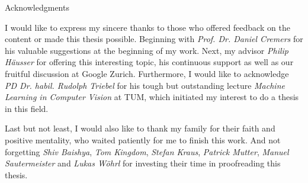 \thispagestyle{empty}

\vspace*{20mm}

\begin{center}
{ Acknowledgments}
\end{center}

\vspace{10mm}

I would like to express my sincere thanks to those who offered feedback on the content or made this thesis possible. Beginning with \textit{Prof. Dr. Daniel Cremers} for his valuable suggestions at the beginning of my work. Next, my advisor \textit{Philip Häusser} for offering this interesting topic, his continuous support as well as our fruitful discussion at Google Zurich. Furthermore, I would like to acknowledge \textit{PD Dr. habil. Rudolph Triebel} for his tough but outstanding lecture \textit{Machine Learning in Computer Vision} at TUM, which initiated my interest to do a thesis in this field.


Last but not least, I would also like to thank my family for their faith and positive mentality, who waited patiently for me to finish this work. And not forgetting \textit{Shiv Baishya}, \textit{Tom Kingdom}, \textit{Stefan Kraus}, \textit{Patrick Mutter}, \textit{Manuel Sautermeister} and \textit{Lukas Wöhrl} for investing their time in proofreading this thesis.

\cleardoublepage{}

